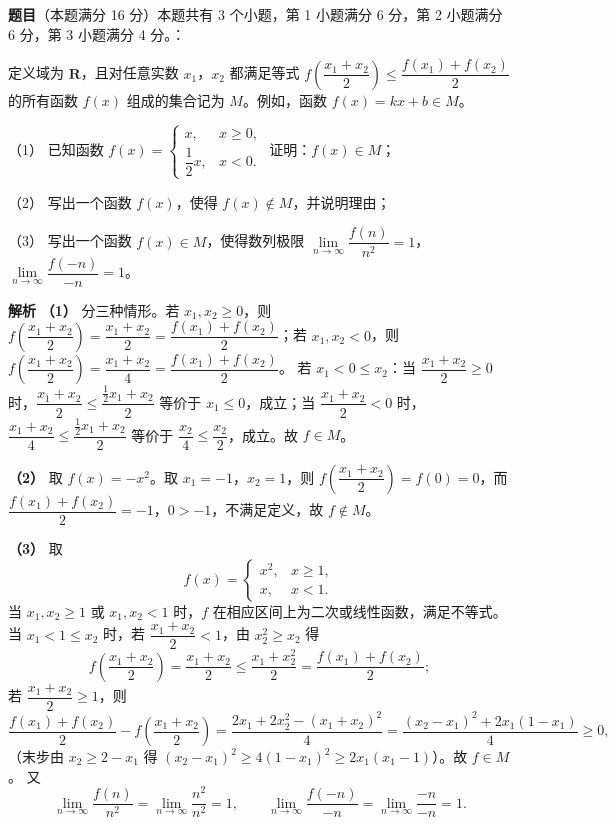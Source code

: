 \begin{answer}

\textbf{题目}（本题满分 16 分）本题共有 3 个小题，第 1 小题满分 6 分，第 2 小题满分 6 分，第 3 小题满分 4 分。：

定义域为 $\mathbf R$，且对任意实数 $x_1$，$x_2$ 都满足等式 $f\left(\dfrac{x_1+x_2}2\right)\leqslant\dfrac{f(x_1)+f(x_2)}2$ 的所有函数 $f(x)$ 组成的集合记为 $M$。例如，函数 $f(x)=kx+b\in M$。

（1） 已知函数 $f(x)=\begin{cases}x,&x\geqslant0,\\ \dfrac12x,&x<0.\end{cases}$ 证明：$f(x)\in M$；

（2） 写出一个函数 $f(x)$，使得 $f(x)\notin M$，并说明理由；

（3） 写出一个函数 $f(x)\in M$，使得数列极限 $\lim\limits_{n\to\infty}\dfrac{f(n)}{n^2}=1$，$\lim\limits_{n\to\infty}\dfrac{f(-n)}{-n}=1$。

\textbf{解析}
\textbf{（1）} 分三种情形。若 $x_1,x_2\geqslant0$，则 $f\left(\dfrac{x_1+x_2}2\right)=\dfrac{x_1+x_2}2=\dfrac{f(x_1)+f(x_2)}2$；若 $x_1,x_2<0$，则 $f\left(\dfrac{x_1+x_2}2\right)=\dfrac{x_1+x_2}4=\dfrac{f(x_1)+f(x_2)}2$。
若 $x_1<0\leqslant x_2$：当 $\dfrac{x_1+x_2}2\geqslant0$ 时，$\dfrac{x_1+x_2}2\leqslant\dfrac{\frac12x_1+x_2}2$ 等价于 $x_1\leqslant0$，成立；当 $\dfrac{x_1+x_2}2<0$ 时，$\dfrac{x_1+x_2}4\leqslant\dfrac{\frac12x_1+x_2}2$ 等价于 $\dfrac{x_2}4\leqslant\dfrac{x_2}2$，成立。故 $f\in M$。

\textbf{（2）} 取 $f(x)=-x^2$。取 $x_1=-1$，$x_2=1$，则 $f\left(\dfrac{x_1+x_2}2\right)=f(0)=0$，而 $\dfrac{f(x_1)+f(x_2)}2=-1$，$0>-1$，不满足定义，故 $f\notin M$。

\textbf{（3）} 取
\nopagebreak[4]
\[f(x)=\begin{cases}x^2,&x\geqslant1,\\ x,&x<1.\end{cases}\]
当 $x_1,x_2\geqslant1$ 或 $x_1,x_2<1$ 时，$f$ 在相应区间上为二次或线性函数，满足不等式。
当 $x_1<1\leqslant x_2$ 时，若 $\dfrac{x_1+x_2}2<1$，由 $x_2^2\geqslant x_2$ 得
\nopagebreak[4]
\[f\left(\frac{x_1+x_2}2\right)=\frac{x_1+x_2}2\leqslant\frac{x_1+x_2^2}2=\frac{f(x_1)+f(x_2)}2;\]
若 $\dfrac{x_1+x_2}2\geqslant1$，则
\nopagebreak[4]
\[\frac{f(x_1)+f(x_2)}2-f\left(\frac{x_1+x_2}2\right)=\frac{2x_1+2x_2^2-(x_1+x_2)^2}{4}=\frac{(x_2-x_1)^2+2x_1(1-x_1)}4\geqslant0,\]
（末步由 $x_2\geqslant2-x_1$ 得 $(x_2-x_1)^2\geqslant4(1-x_1)^2\geqslant2x_1(x_1-1)$）。故 $f\in M$。
又
\nopagebreak[4]
\[\lim_{n\to\infty}\frac{f(n)}{n^2}=\lim_{n\to\infty}\frac{n^2}{n^2}=1,\qquad \lim_{n\to\infty}\frac{f(-n)}{-n}=\lim_{n\to\infty}\frac{-n}{-n}=1.\]


\end{answer}
